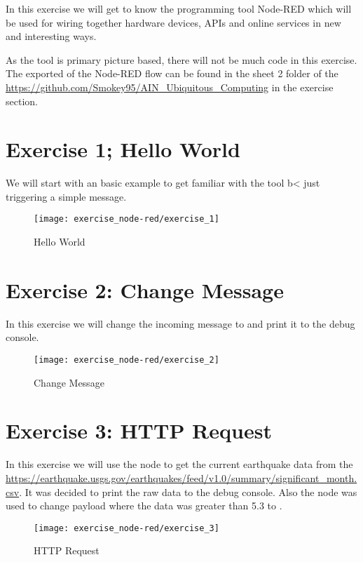 
In this exercise we will get to know the programming tool Node-RED which will be used 
for wiring together hardware devices, APIs and online services in new and interesting ways.

As the tool is primary picture based, there will not be much code in this exercise.
The exported  of the Node-RED flow can be found in the sheet 2 folder of the 
\url{https://github.com/Smokey95/AIN_Ubiquitous_Computing} in the exercise section.


\section{Exercise 1; Hello World}

We will start with an basic example to get familiar with the tool b< just triggering a 
simple  message.

\begin{figure}[h!]
  \centering
  \texttt{[image: exercise\_node-red/exercise\_1]}
  \caption{Hello World}
  \label{fig:hello_world}
\end{figure}


\section{Exercise 2: Change Message}

In this exercise we will change the incoming  message to  and 
print it to the debug console.

\begin{figure}[h!]
  \centering
  \texttt{[image: exercise\_node-red/exercise\_2]}
  \caption{Change Message}
  \label{fig:change_message}
\end{figure}


\section{Exercise 3: HTTP Request}

In this exercise we will use the  node to get the current earthquake data from 
the \url{https://earthquake.usgs.gov/earthquakes/feed/v1.0/summary/significant_month.csv}.
It was decided to print the raw data to the debug console. Also the  node was used to 
change payload where the  data was greater than 5.3 to .

\begin{figure}[h!]
  \centering
  \texttt{[image: exercise\_node-red/exercise\_3]}
  \caption{HTTP Request}
  \label{fig:http_request}
\end{figure}



